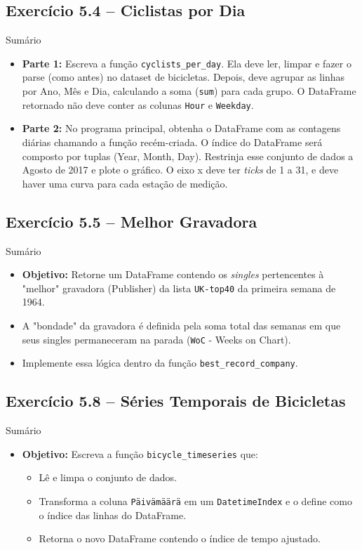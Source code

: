 \documentclass[11pt,a4paper]{article}
\begin{document}
\subsection*{Exercício 5.4 -- Ciclistas por Dia}
\begin{exercicio}{Sumário}
\begin{itemize}
    \item \textbf{Parte 1:} Escreva a função \texttt{cyclists\_per\_day}. Ela deve ler, limpar e fazer o parse (como antes) no dataset de bicicletas. Depois, deve agrupar as linhas por Ano, Mês e Dia, calculando a soma (\texttt{sum}) para cada grupo. O DataFrame retornado não deve conter as colunas \texttt{Hour} e \texttt{Weekday}.
    \item \textbf{Parte 2:} No programa principal, obtenha o DataFrame com as contagens diárias chamando a função recém-criada. O índice do DataFrame será composto por tuplas (Year, Month, Day). Restrinja esse conjunto de dados a Agosto de 2017 e plote o gráfico. O eixo x deve ter \textit{ticks} de 1 a 31, e deve haver uma curva para cada estação de medição.
\end{itemize}
\end{exercicio}

\subsection*{Exercício 5.5 -- Melhor Gravadora}
\begin{exercicio}{Sumário}
\begin{itemize}
    \item \textbf{Objetivo:} Retorne um DataFrame contendo os \textit{singles} pertencentes à "melhor" gravadora (Publisher) da lista \texttt{UK-top40} da primeira semana de 1964.
    \item A "bondade" da gravadora é definida pela soma total das semanas em que seus singles permaneceram na parada (\texttt{WoC} - Weeks on Chart).
    \item Implemente essa lógica dentro da função \texttt{best\_record\_company}.
\end{itemize}
\end{exercicio}

\subsection*{Exercício 5.8 -- Séries Temporais de Bicicletas}
\begin{exercicio}{Sumário}
\begin{itemize}
    \item \textbf{Objetivo:} Escreva a função \texttt{bicycle\_timeseries} que:
    \begin{itemize}
        \item Lê e limpa o conjunto de dados.
        \item Transforma a coluna \texttt{Päivämäärä} em um \texttt{DatetimeIndex} e o define como o índice das linhas do DataFrame.
        \item Retorna o novo DataFrame contendo o índice de tempo ajustado.
    \end{itemize}
\end{itemize}
\end{exercicio}
\end{document}
